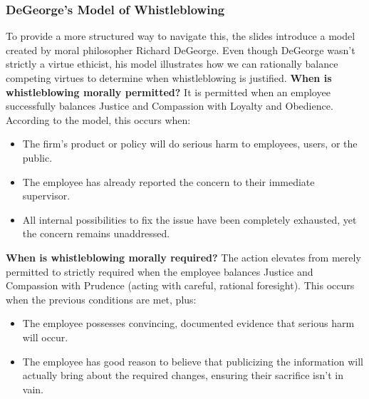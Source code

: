 \documentclass[12pt]{article}
\begin{document}
\subsubsection{DeGeorge's Model of Whistleblowing}
To provide a more structured way to navigate this, the slides introduce a model created by moral philosopher Richard DeGeorge. Even though DeGeorge wasn't strictly a virtue ethicist, his model illustrates how we can rationally balance competing virtues to determine when whistleblowing is justified.\newline
\textbf{When is whistleblowing morally permitted?} It is permitted when an employee successfully balances Justice and Compassion with Loyalty and Obedience. According to the model, this occurs when:
\begin{itemize}
    \item The firm's product or policy will do serious harm to employees, users, or the public.
    \item The employee has already reported the concern to their immediate supervisor.
    \item All internal possibilities to fix the issue have been completely exhausted, yet the concern remains unaddressed.
\end{itemize}
\textbf{When is whistleblowing morally required?} The action elevates from merely permitted to strictly required when the employee balances Justice and Compassion with Prudence (acting with careful, rational foresight). This occurs when the previous conditions are met, plus:
\begin{itemize}
    \item The employee possesses convincing, documented evidence that serious harm will occur.
    \item The employee has good reason to believe that publicizing the information will actually bring about the required changes, ensuring their sacrifice isn't in vain.
\end{itemize}
\end{document}
